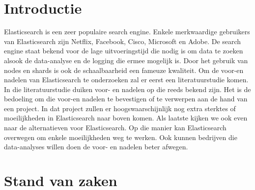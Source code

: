 \documentclass[fleqn,10pt]{voorstel}
\affiliation{\textbf{Contact:}
	\textsuperscript{3} \href{mailto:ruben.standaert.w1083@student.hogent.be}{ruben.standaert.w1083@student.hogent.be}}
\begin{document}
	
	\flushbottom %
	\maketitle %
	\tableofcontents %
	\thispagestyle{empty} %
	
	
	
	\section{Introductie} %
	\label{sec:introductie}
	
	Elasticsearch is een zeer populaire search engine. Enkele merkwaardige gebruikers van Elasticsearch zijn Netflix, Facebook, Cisco, Microsoft en Adobe. De search engine staat bekend voor de lage uitvoeringstijd die nodig is om data te zoeken alsook de data-analyse en de logging die ermee mogelijk is. Door het gebruik van nodes en shards is ook de schaalbaarheid een fameuze kwaliteit. Om de voor-en nadelen van Elasticsearch te onderzoeken zal er eerst een literatuurstudie komen. In die literatuurstudie duiken voor- en nadelen op die reeds bekend zijn. Het is de bedoeling om die voor-en nadelen te bevestigen of te verwerpen aan de hand van een project. In dat project zullen er hoogswaarschijnlijk nog extra sterktes of moeilijkheden in Elasticsearch naar boven komen. Als laatste kijken we ook even naar de alternatieven voor Elasticsearch. Op die manier kan Elasticsearch overwegen om enkele moeilijkheden weg te werken. Ook kunnen bedrijven die data-analyses willen doen de voor- en nadelen beter afwegen.
	
	
	
	\section{Stand van zaken}
	\label{sec:stand_van_zaken}
	
\end{document}
